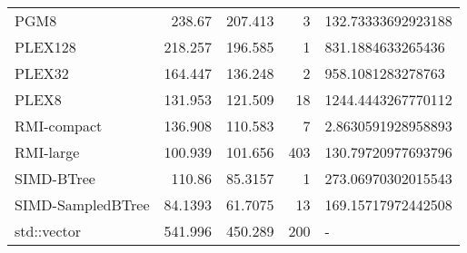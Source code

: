 \begin{tabular}{lrrrl}
 PGM8              &               238.67   &              207.413  &            3 & 132.73333692923188 \\
 PLEX128           &               218.257  &              196.585  &            1 & 831.1884633265436  \\
 PLEX32            &               164.447  &              136.248  &            2 & 958.1081283278763  \\
 PLEX8             &               131.953  &              121.509  &           18 & 1244.4443267770112 \\
 RMI-compact       &               136.908  &              110.583  &            7 & 2.8630591928958893 \\
 RMI-large         &               100.939  &              101.656  &          403 & 130.79720977693796 \\
 SIMD-BTree        &               110.86   &               85.3157 &            1 & 273.06970302015543 \\
 SIMD-SampledBTree &                84.1393 &               61.7075 &           13 & 169.15717972442508 \\
 std::vector       &               541.996  &              450.289  &          200 & -                  \\
\hline
\end{tabular}